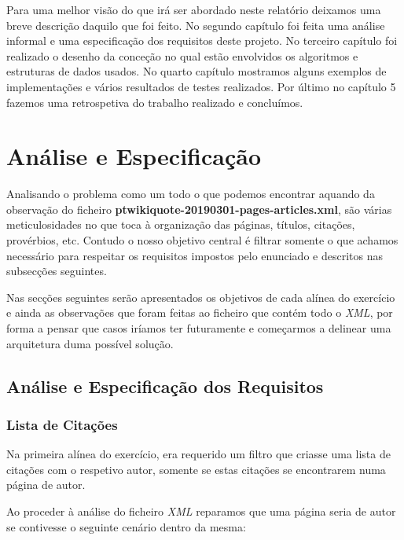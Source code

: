 \documentclass[11pt,a4paper]{report}
\begin{document}
Para uma melhor visão do que irá ser abordado neste relatório deixamos uma breve descrição daquilo que foi feito. No segundo capítulo foi feita uma análise informal e uma especificação dos requisitos deste projeto. No terceiro capítulo foi realizado o desenho da conceção no qual estão envolvidos os algoritmos e estruturas de dados usados. No quarto capítulo mostramos alguns exemplos de implementações e vários resultados de testes realizados. Por último no capítulo 5 fazemos uma retrospetiva do trabalho realizado e concluímos.



\chapter{Análise e Especificação}
\label{chap:analise}

Analisando o problema como um todo o que podemos encontrar aquando da observação do ficheiro \textbf{ptwikiquote-20190301-pages-articles.xml}, são várias meticulosidades no que toca à organização das páginas, títulos, citações, provérbios, etc. Contudo o nosso objetivo central é filtrar somente o que achamos necessário para respeitar os requisitos impostos pelo enunciado e descritos nas subsecções seguintes.

Nas secções seguintes serão apresentados os objetivos de cada alínea do exercício e ainda as observações que foram feitas ao ficheiro que contém todo o \emph{XML}, por forma a pensar que casos iríamos ter futuramente e começarmos a delinear uma arquitetura duma possível solução.

\section{Análise e Especificação dos Requisitos}
\subsection{Lista de Citações}

Na primeira alínea do exercício, era requerido um filtro que criasse uma lista de citações com o respetivo autor, somente se estas citações se encontrarem numa página de autor.

Ao proceder à análise do ficheiro \emph{XML} reparamos que uma página seria de autor se contivesse o seguinte cenário dentro da mesma:
\end{document}
